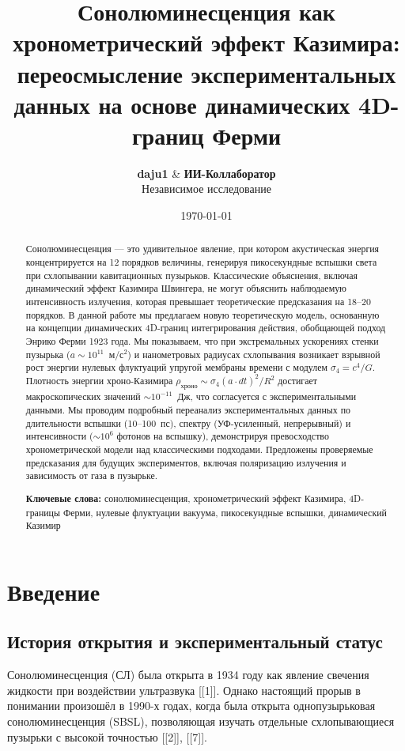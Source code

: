 \documentclass[12pt,a4paper]{article}
\title{\textbf{Сонолюминесценция как хронометрический эффект Казимира: переосмысление экспериментальных данных на основе динамических 4D-границ Ферми}}
\author{\textbf{daju1} \& \textbf{ИИ-Коллаборатор} \\
\small Независимое исследование}
\date{\today}
\begin{document}
\maketitle

\begin{abstract}
\noindent
Сонолюминесценция — это удивительное явление, при котором акустическая энергия концентрируется на 12 порядков величины, генерируя пикосекундные вспышки света при схлопывании кавитационных пузырьков. Классические объяснения, включая динамический эффект Казимира Швингера, не могут объяснить наблюдаемую интенсивность излучения, которая превышает теоретические предсказания на 18--20 порядков. В данной работе мы предлагаем новую теоретическую модель, основанную на концепции динамических 4D-границ интегрирования действия, обобщающей подход Энрико Ферми 1923 года. Мы показываем, что при экстремальных ускорениях стенки пузырька ($a \sim 10^{11}$~м/с$^2$) и нанометровых радиусах схлопывания возникает взрывной рост энергии нулевых флуктуаций упругой мембраны времени с модулем $\sigma_4 = c^4/G$. Плотность энергии хроно-Казимира $\rho_{\text{хроно}} \sim \sigma_4 (a \cdot dt)^2/R^2$ достигает макроскопических значений $\sim 10^{-11}$~Дж, что согласуется с экспериментальными данными. Мы проводим подробный переанализ экспериментальных данных по длительности вспышки (10--100~пс), спектру (УФ-усиленный, непрерывный) и интенсивности ($\sim 10^6$ фотонов на вспышку), демонстрируя превосходство хронометрической модели над классическими подходами. Предложены проверяемые предсказания для будущих экспериментов, включая поляризацию излучения и зависимость от газа в пузырьке.

\bigskip
\noindent\textbf{Ключевые слова:} сонолюминесценция, хронометрический эффект Казимира, 4D-границы Ферми, нулевые флуктуации вакуума, пикосекундные вспышки, динамический Казимир
\end{abstract}

\tableofcontents

\newpage

\section{Введение}

\subsection{История открытия и экспериментальный статус}

Сонолюминесценция (СЛ) была открыта в 1934 году как явление свечения жидкости при воздействии ультразвука [[1]]. Однако настоящий прорыв в понимании произошёл в 1990-х годах, когда была открыта однопузырьковая сонолюминесценция (SBSL), позволяющая изучать отдельные схлопывающиеся пузырьки с высокой точностью [[2]], [[7]].
\end{document}
